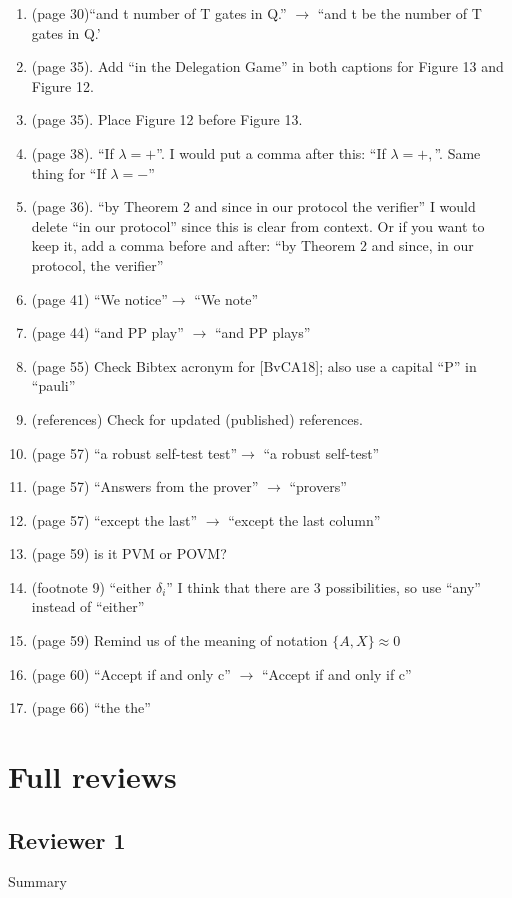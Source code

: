 \documentclass[12pt]{article}
\begin{document}
\begin{enumerate}
\item (page 30)``and t number
of T gates in Q.'' $\rightarrow$ ``and t be the number
of T gates in Q.'
\item (page 35). Add ``in the Delegation Game'' in both captions for Figure 13 and Figure 12.
\item (page 35). Place Figure 12 before Figure 13.
\item (page 38). ``If $\lambda = +$''. I would put a comma after this: ``If $\lambda = +,$''. Same thing for ``If $\lambda = -$''
\item (page 36). ``by Theorem 2 and since in
our protocol the verifier'' I would delete ``in our protocol'' since this is clear from context. Or if you want to keep it, add a comma before and after: ``by Theorem 2 and since, in
our protocol, the verifier''
\item (page 41) ``We notice''$\rightarrow$ ``We note''
\item (page 44) ``and PP play'' $\rightarrow$ ``and PP plays''
\item (page 55) Check Bibtex acronym for [BvCA18]; also use a capital ``P'' in ``pauli''
\item (references) Check for updated (published) references.
\item (page 57) ``a robust self-test test''$\rightarrow$ ``a robust self-test''
\item (page 57) ``Answers from the prover'' $\rightarrow$ ``provers''
\item (page 57) ``except the last'' $\rightarrow$ ``except the last column''
\item (page 59) is it PVM or POVM?
\item (footnote 9) ``either $\delta_i$'' I think that there are 3 possibilities, so use ``any'' instead of ``either''
\item (page 59) Remind us of the meaning of notation $\{A,X\} \approx 0$
\item (page 60) ``Accept if and only c'' $\rightarrow$ ``Accept if and only if c''
\item (page 66) ``the the''
\end{enumerate}




\clearpage

\section{Full reviews}	
	\appendix
\subsection*{Reviewer 1}
Summary
\end{document}
